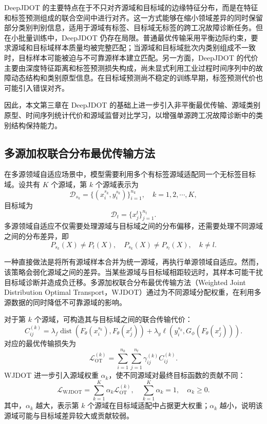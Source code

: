 \documentclass{seuthesis-2022}
\begin{document}
DeepJDOT 的主要特点在于不只对齐源域和目标域的边缘特征分布，而是在特征和标签预测组成的联合空间中进行对齐。这一方式能够在缩小领域差异的同时保留部分类别判别信息，适用于源域有标签、目标域无标签的跨工况故障诊断任务。但在小批量训练中，DeepJDOT 仍存在局限。普通最优传输采用平衡边际约束，要求源域和目标域样本质量均被完整匹配；当源域和目标域批次内类别组成不一致时，目标样本可能被迫与不可靠源样本建立匹配。另一方面，DeepJDOT 的代价主要由深度特征距离和标签预测损失构成，尚未显式利用工业过程时间序列中的故障动态结构和类别原型信息。在目标域预测尚不稳定的训练早期，标签预测代价也可能引入错误对齐。

因此，本文第三章在 DeepJDOT 的基础上进一步引入非平衡最优传输、源域类别原型、时间序列统计代价和源域监督对比学习，以增强单源跨工况故障诊断中的类别结构保持能力。

\subsection{多源加权联合分布最优传输方法}

在多源领域自适应场景中，模型需要利用多个有标签源域适配同一个无标签目标域。设共有 $K$ 个源域，第 $k$ 个源域表示为
\begin{equation}
    \mathcal{D}_{s_k}
    =
    \{(x_i^{s_k},y_i^{s_k})\}_{i=1}^{n_k},
    \quad k=1,2,\cdots,K,
\end{equation}
目标域为
\begin{equation}
    \mathcal{D}_t=\{x_j^t\}_{j=1}^{n_t}.
\end{equation}
多源领域自适应不仅需要处理源域与目标域之间的分布偏移，还需要处理不同源域之间的分布差异，即
\begin{equation}
    P_{s_k}(X) \neq P_t(X),
    \quad
    P_{s_k}(X) \neq P_{s_l}(X),
    \quad k \neq l.
\end{equation}

一种直接做法是将所有源域样本合并为统一源域，再执行单源领域自适应。然而，该策略会弱化源域之间的差异。当某些源域与目标域相距较远时，其样本可能干扰目标域诊断并造成负迁移。多源加权联合分布最优传输方法（Weighted Joint Distribution Optimal Transport，WJDOT）通过为不同源域分配权重，在利用多源数据的同时降低不可靠源域的影响\cite{turrisi2022wjdot}。

对于第 $k$ 个源域，可构造其与目标域之间的联合传输代价：
\begin{equation}
    C_{ij}^{(k)}
    =
    \lambda_f \operatorname{dist}\left(F_\theta(x_i^{s_k}),F_\theta(x_j^t)\right)
    +
    \lambda_y \ell\left(y_i^{s_k},G_\phi(F_\theta(x_j^t))\right).
\end{equation}
对应的最优传输损失为
\begin{equation}
    \mathcal{L}_{\mathrm{OT}}^{(k)}
    =
    \sum_{i=1}^{n_k}\sum_{j=1}^{n_t}
    \gamma_{ij}^{(k)} C_{ij}^{(k)}.
\end{equation}
WJDOT 进一步引入源域权重 $\alpha_k$，使不同源域对最终目标函数的贡献不同：
\begin{equation}
    \mathcal{L}_{\mathrm{WJDOT}}
    =
    \sum_{k=1}^{K}
    \alpha_k
    \mathcal{L}_{\mathrm{OT}}^{(k)},
    \quad
    \sum_{k=1}^{K}\alpha_k=1,
    \quad
    \alpha_k \geq 0.
\end{equation}
其中，$\alpha_k$ 越大，表示第 $k$ 个源域在目标域适配中占据更大权重；$\alpha_k$ 越小，说明该源域可能与目标域差异较大或贡献较弱。
\end{document}
